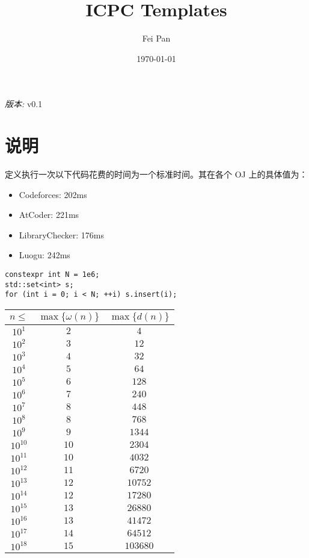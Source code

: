 \documentclass[12pt]{ctexart}
\title{ICPC Templates}
\date{\today}
\author{Fei Pan}
\newcommand{\version}{v0.1}
\begin{document}
\maketitle
\thispagestyle{empty}
\begin{center}
    \textit{版本: }\version
\end{center}

\tableofcontents
\newpage

\section{说明}

定义执行一次以下代码花费的时间为一个标准时间。其在各个 OJ 上的具体值为：

\begin{itemize}
\item Codeforces: 202ms
\item AtCoder: 221ms
\item LibraryChecker: 176ms
\item Luogu: 242ms
\end{itemize}
\begin{lstlisting}
constexpr int N = 1e6;
std::set<int> s;
for (int i = 0; i < N; ++i) s.insert(i);
\end{lstlisting}

\begin{tabular}{|c|c|c|}
\hline
$n \le$ & $\max\{\omega(n)\}$ & $\max\{d(n)\}$ \\
\hline
$10^{1}$ & $2$ & $4$ \\
\hline
$10^{2}$ & $3$ & $12$ \\
\hline
$10^{3}$ & $4$ & $32$ \\
\hline
$10^{4}$ & $5$ & $64$ \\
\hline
$10^{5}$ & $6$ & $128$ \\
\hline
$10^{6}$ & $7$ & $240$ \\
\hline
$10^{7}$ & $8$ & $448$ \\
\hline
$10^{8}$ & $8$ & $768$ \\
\hline
$10^{9}$ & $9$ & $1344$ \\
\hline
$10^{10}$ & $10$ & $2304$ \\
\hline
$10^{11}$ & $10$ & $4032$ \\
\hline
$10^{12}$ & $11$ & $6720$ \\
\hline
$10^{13}$ & $12$ & $10752$ \\
\hline
$10^{14}$ & $12$ & $17280$ \\
\hline
$10^{15}$ & $13$ & $26880$ \\
\hline
$10^{16}$ & $13$ & $41472$ \\
\hline
$10^{17}$ & $14$ & $64512$ \\
\hline
$10^{18}$ & $15$ & $103680$ \\
\hline
\end{tabular}
\end{document}
